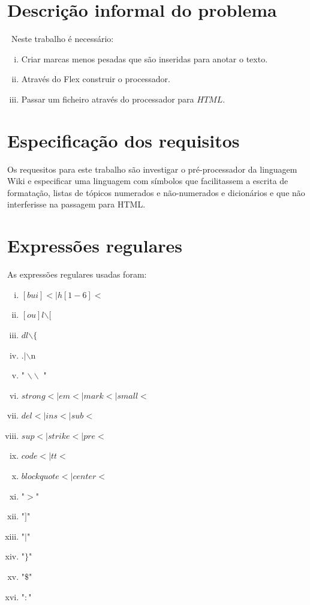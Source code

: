 \documentclass{report}
\begin{document}
\section{Descrição informal do problema}\
Neste trabalho é necessário:
\begin{enumerate}[i)]
\item Criar marcas menos pesadas que são inseridas para anotar o texto.
\item Através do Flex construir o processador.
\item Passar um ficheiro através do processador para $HTML$.
\end{enumerate}

\section{Especificação dos requisitos}

Os requesitos para este trabalho são investigar o pré-processador da linguagem Wiki e especificar uma linguagem com símbolos que facilitassem a escrita de formatação, listas de tópicos numerados e não-numerados e dicionários e que não interferisse na passagem para HTML.
 
\section{Expressões regulares} 

As expressões regulares usadas foram:

\begin{enumerate}[i)]
\item $ [bui]< | h[1-6]< $
\item $ [ou]l$$\backslash$$[$
\item $ dl$$\backslash$$\{$
\item $ .|$$\backslash$n
\item " $\backslash\backslash$ "
\item $strong<|em<|mark<|small<$
\item $del<|ins<|sub<$
\item $sup<|strike<|pre<$
\item $code<|tt<$
\item $ blockquote<|center<$
\item "$>$"
\item "$]$"
\item "$|$"
\item "$\}$"
\item "$\$$"
\item "$:$"


\end{enumerate}
\end{document}
